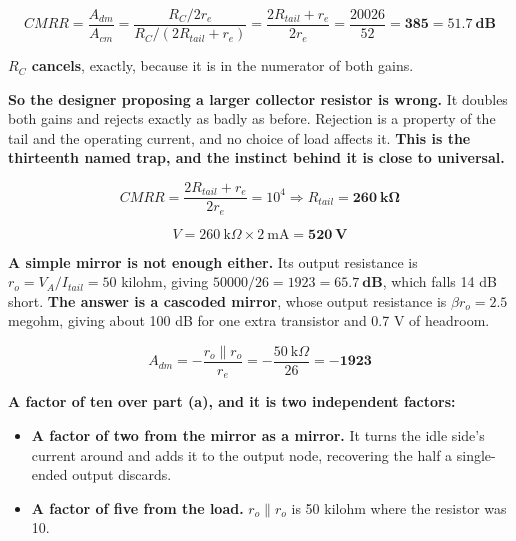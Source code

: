 \[
  CMRR = \frac{A_{dm}}{A_{cm}} = \frac{R_C/2r_e}{R_C/(2R_{tail} + r_e)}
  = \frac{2R_{tail} + r_e}{2r_e} = \frac{20026}{52} = \mathbf{385} = \mathbf{51.7\ \text{dB}}
\]

\textbf{$R_C$ cancels}, exactly, because it is in the numerator of both gains.

\textbf{So the designer proposing a larger collector resistor is wrong.} It doubles both gains and rejects exactly as badly as before. Rejection is a property of the tail and the operating current, and no choice of load affects it. \textbf{This is the thirteenth named trap, and the instinct behind it is close to universal.}


\[
  CMRR = \frac{2R_{tail} + r_e}{2r_e} = 10^4 \Rightarrow R_{tail} = \mathbf{260\ \text{k}\Omega}
\]

\[
  V = 260\ \text{k}\Omega \times 2\ \text{mA} = \mathbf{520\ \text{V}}
\]

\textbf{A simple mirror is not enough either.} Its output resistance is $r_o = V_A/I_{tail} = 50$ kilohm, giving $50000/26 = 1923 = \mathbf{65.7\ \text{dB}}$, which falls 14 dB short. \textbf{The answer is a cascoded mirror}, whose output resistance is $\beta r_o = 2.5$ megohm, giving about 100 dB for one extra transistor and 0.7 V of headroom.


\[
  A_{dm} = -\frac{r_o \parallel r_o}{r_e} = -\frac{50\ \text{k}\Omega}{26} = \mathbf{-1923}
\]

\textbf{A factor of ten over part (a), and it is two independent factors:}

\begin{itemize}
  \item \textbf{A factor of two from the mirror as a mirror.} It turns the idle side's current around and adds it to the output node, recovering the half a single-ended output discards.
  \item \textbf{A factor of five from the load.} $r_o \parallel r_o$ is 50 kilohm where the resistor was 10.
\end{itemize}


